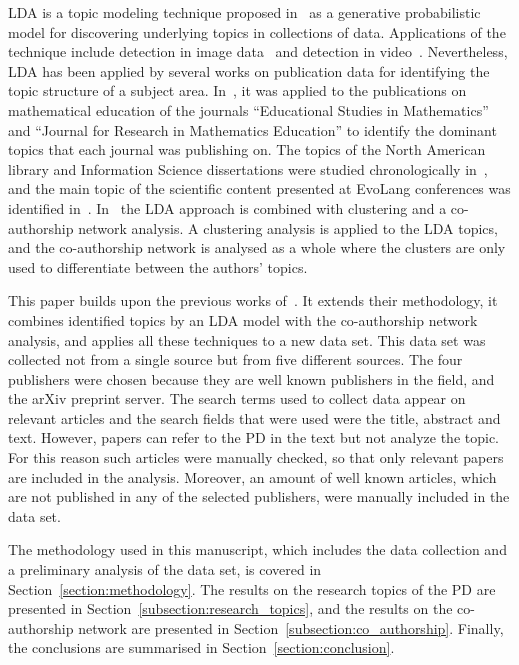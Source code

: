 \documentclass{article}
\theoremstyle{definition}
\begin{document}
LDA is a topic modeling technique proposed
in~\citep{Blei2003} as a generative probabilistic model for discovering
underlying topics in collections of data.
Applications of the technique include detection in image data~\citep{
Coelho2010} and detection in video~\citep{Wang2008}. Nevertheless,
LDA has been applied by several works on publication data for identifying the
topic structure of a subject area. In~\citep{Inglis2018}, it was applied to the
publications on mathematical education of the journals ``Educational Studies in
Mathematics'' and ``Journal for Research in Mathematics Education'' to
identify the dominant topics that each journal was publishing on. The topics of
the North American library and Information Science dissertations were 
studied chronologically in~\citep{Sugimoto2011}, and the main topic of the
scientific content presented at EvoLang conferences was identified
in~\citep{Bergmann2018}. In~\citep{Bergmann2018} the LDA approach is combined with
clustering and a co-authorship network analysis. A clustering analysis is
applied to the LDA topics, and the co-authorship network is analysed as a whole
where the clusters are only used to differentiate between the authors' topics.

This paper builds upon the previous works of~\citep{Bergmann2018, Liu2015,
youngblood2018}. It extends their methodology, it combines identified topics by
an LDA model with the co-authorship network analysis, and applies all these
techniques to a new data set. This data set was collected not from a single
source but from five different sources. The four publishers were chosen because
they are well known publishers in the field, and the arXiv preprint server. 
The search
terms used to collect data appear on relevant articles and the search fields
that were used were the title, abstract and text. However, papers can refer to
the PD in the text but not analyze the topic. For this reason such articles were
manually checked, so that only relevant papers are included in the analysis.
Moreover, an amount of well
known articles, which are not published in any of the selected publishers, were
manually included in the data set.

The methodology used in this manuscript, which
includes the data collection and a preliminary analysis of the data set, is
covered in Section~\ref{section:methodology}. The results on the research topics
of the PD are presented in Section~\ref{subsection:research_topics}, and the
results on the co-authorship network are presented in
Section~\ref{subsection:co_authorship}. Finally, the conclusions are summarised
in Section~\ref{section:conclusion}.
\end{document}
